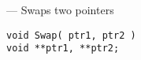 --- Swaps two pointers 
\startvb\begin{verbatim}
void Swap( ptr1, ptr2 )
void **ptr1, **ptr2;

\end{verbatim}
\endvb

\endmanpage

